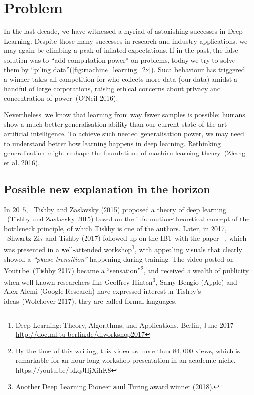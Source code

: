 \documentclass[
  letterpaper,
]{tufte-book}
\begin{document}
\hypertarget{problem}{%
\section{Problem}\label{problem}}

In the last decade, we have witnessed a myriad of astonishing successes
in Deep Learning. Despite those many successes in research and industry
applications, we may again be climbing a peak of inflated expectations.
If in the past, the false solution was to ``add computation power'' on
problems, today we try to solve them by ``piling
data''(\protect\hyperlink{fig:machine_learning_2x}{{[}fig:machine\_learning\_2x{]}}).
Such behaviour has triggered a winner-takes-all competition for who
collects more data (our data) amidst a handful of large corporations,
raising ethical concerns about privacy and concentration of
power~(O'Neil 2016).

Nevertheless, we know that learning from way fewer samples is possible:
humans show a much better generalisation ability than our current
state-of-the-art artificial intelligence. To achieve such needed
generalisation power, we may need to understand better how learning
happens in deep learning. Rethinking generalisation might reshape the
foundations of machine learning theory~(Zhang et al. 2016).

\hypertarget{possible-new-explanation-in-the-horizon}{%
\subsection{Possible new explanation in the
horizon}\label{possible-new-explanation-in-the-horizon}}

In \(2015\), ~Tishby and Zaslavsky (2015) proposed a theory of deep
learning ~(Tishby and Zaslavsky 2015) based on the
information-theoretical concept of the bottleneck principle, of which
Tishby is one of the authors. Later, in 2017, ~Shwartz-Ziv and Tishby
(2017) followed up on the {IBT} with the paper ~, which was presented in
a well-attended workshop\footnote{Deep Learning: Theory, Algorithms, and
  Applications. Berlin, June 2017
  \url{http://doc.ml.tu-berlin.de/dlworkshop2017}}, with appealing
visuals that clearly showed a \emph{``phase transition''} happening
during training. The video posted on Youtube~(Tishby 2017) became a
``sensation''\footnote{By the time of this writing, this video as more
  than \(84,000\) views, which is remarkable for an hour-long workshop
  presentation in an academic niche. \url{https://youtu.be/bLqJHjXihK8}},
and received a wealth of publicity when well-known researchers like
Geoffrey Hinton\footnote{Another Deep Learning Pioneer \textbf{and}
  Turing award winner (2018).}, Samy Bengio (Apple) and Alex Alemi
(Google Research) have expressed interest in Tishby's ideas~(Wolchover
2017). they are called formal languages.
\end{document}
